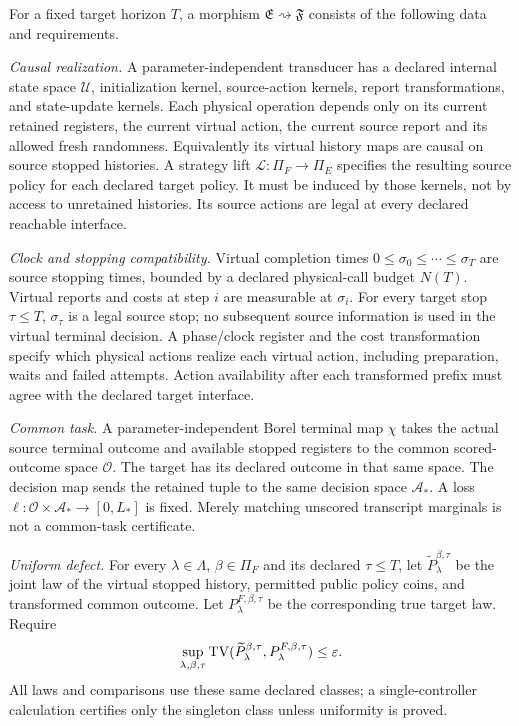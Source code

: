 \begin{definition}\label{def:morphism}
For a fixed target horizon $T$, a morphism $\mathfrak E\rightsquigarrow\mathfrak F$ consists of the following data and requirements.

\emph{Causal realization.} A parameter-independent transducer has a declared internal state space $\mathcal U$, initialization kernel, source-action kernels, report transformations, and state-update kernels. Each physical operation depends only on its current retained registers, the current virtual action, the current source report and its allowed fresh randomness. Equivalently its virtual history maps are causal on source stopped histories. A strategy lift $\mathscr L:\Pi_F\to\Pi_E$ specifies the resulting source policy for each declared target policy. It must be induced by those kernels, not by access to unretained histories. Its source actions are legal at every declared reachable interface.

\emph{Clock and stopping compatibility.} Virtual completion times $0\le\sigma_0\le\cdots\le\sigma_T$ are source stopping times, bounded by a declared physical-call budget $N(T)$. Virtual reports and costs at step $i$ are measurable at $\sigma_i$. For every target stop $\tau\le T$, $\sigma_\tau$ is a legal source stop; no subsequent source information is used in the virtual terminal decision. A phase/clock register and the cost transformation specify which physical actions realize each virtual action, including preparation, waits and failed attempts. Action availability after each transformed prefix must agree with the declared target interface.

\emph{Common task.} A parameter-independent Borel terminal map $\chi$ takes the actual source terminal outcome and available stopped registers to the common scored-outcome space $\mathcal O$. The target has its declared outcome in that same space. The decision map sends the retained tuple to the same decision space $\mathcal A_*$. A loss $\ell:\mathcal O\times\mathcal A_*\to[0,L_*]$ is fixed. Merely matching unscored transcript marginals is not a common-task certificate.

\emph{Uniform defect.} For every $\lambda\in\Lambda$, $\beta\in\Pi_F$ and its declared $\tau\le T$, let $\widetilde P^{\beta,\tau}_\lambda$ be the joint law of the virtual stopped history, permitted public policy coins, and transformed common outcome. Let $P^{F,\beta,\tau}_\lambda$ be the corresponding true target law. Require
\begin{equation}\label{eq:defect}
 \sup_{\lambda,\beta,\tau}
 \operatorname{TV}(\widetilde P^{\beta,\tau}_\lambda,P^{F,\beta,\tau}_\lambda)
 \le\varepsilon.
\end{equation}
All laws and comparisons use these same declared classes; a single-controller calculation certifies only the singleton class unless uniformity is proved.


\end{definition}
